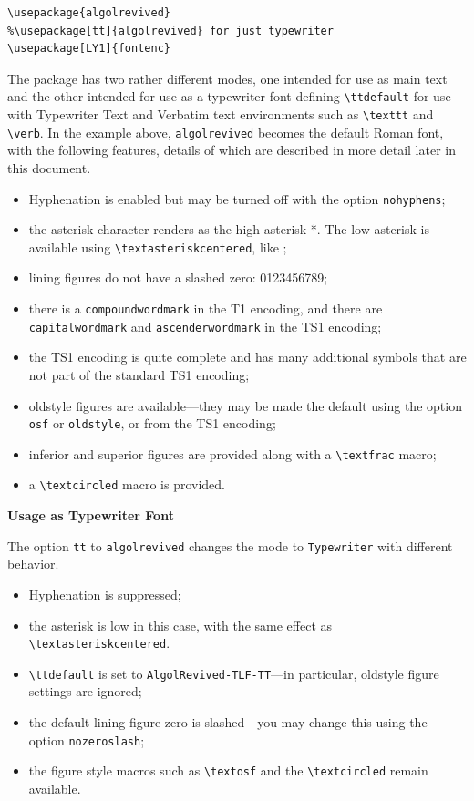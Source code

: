 \documentclass[11pt]{article}
\begin{document}
\begin{verbatim}
\usepackage{algolrevived}
%\usepackage[tt]{algolrevived} for just typewriter
\usepackage[LY1]{fontenc}
\end{verbatim}
The package has two rather different modes, one intended for use as main text and the other intended for use as a typewriter font defining \verb|\ttdefault| for use with Typewriter Text and Verbatim text environments such as \verb|\texttt| and \verb|\verb|. In the example above, {\tt algolrevived} becomes the default Roman font, with the following features, details of which are described in more detail later in this document.
\begin{itemize}
\item
Hyphenation is enabled but may be turned off with the option {\tt nohyphens};
\item
the asterisk character renders as the high asterisk *. The low asterisk is available using  \verb|\textasteriskcentered|, like \textasteriskcentered;
\item lining figures do not have a slashed zero:  0123456789;
\item
there is a {\tt compoundwordmark} in the T1 encoding, and there are {\tt capitalwordmark} and {\tt ascenderwordmark} in the TS1 encoding;
\item
the TS1 encoding is quite complete and has many additional symbols that are not part of the standard TS1 encoding;
\item oldstyle figures are available---they may be made the default using the option {\tt osf} or {\tt oldstyle}, or from the TS1 encoding;
\item inferior and superior figures are provided along with a \verb|\textfrac| macro;
\item a \verb|\textcircled| macro is provided.
\end{itemize}

\textbf{Usage as Typewriter Font}

The option {\tt tt} to {\tt algolrevived} changes the mode to {\tt Typewriter} with different behavior.
\begin{itemize}
\item
Hyphenation is suppressed;
\item
the asterisk is low in this case, with the same effect as \verb|\textasteriskcentered|.
\item \verb|\ttdefault| is set to {\tt AlgolRevived-TLF-TT}---in particular, oldstyle figure settings are ignored;
\item the default lining figure zero is slashed---you may change this using the option {\tt nozeroslash};
\item the figure style macros such as \verb|\textosf| and the \verb|\textcircled| remain available.
\end{itemize}
\end{document}
